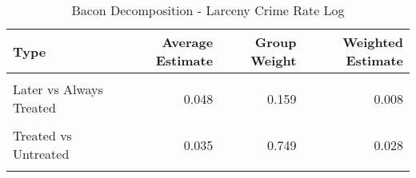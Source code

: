 \begin{table}[H]

\caption{\label{tab:tab:bacondecompositionLarceny}Bacon Decomposition - Larceny Crime Rate Log}
\centering
\begin{tabular}[t]{lrrr}
\toprule
Type & Average Estimate & Group Weight & Weighted Estimate\\
\midrule
\cellcolor{gray!6}{Earlier vs Later Treated} & \cellcolor{gray!6}{0.009} & \cellcolor{gray!6}{0.068} & \cellcolor{gray!6}{0.000}\\
Later vs Always Treated & 0.048 & 0.159 & 0.008\\
\cellcolor{gray!6}{Later vs Earlier Treated} & \cellcolor{gray!6}{0.062} & \cellcolor{gray!6}{0.023} & \cellcolor{gray!6}{0.000}\\
Treated vs Untreated & 0.035 & 0.749 & 0.028\\
\cellcolor{gray!6}{Total TWFE} & \cellcolor{gray!6}{NaN} & \cellcolor{gray!6}{NaN} & \cellcolor{gray!6}{0.036}\\
\bottomrule
\end{tabular}
\end{table}
